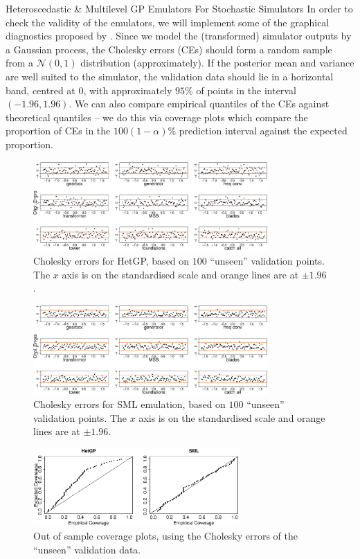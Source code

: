 \begin{chapter}{Heteroscedastic \& Multilevel GP Emulators For Stochastic Simulators\label{Ch:Hetsml}}
In order to check the validity of the emulators, we will implement some of the graphical diagnostics proposed by \citet{Bastos09}. Since we model the (transformed) simulator outputs by a Gaussian process, the Cholesky errors (CEs) should form a random sample from a $\mathcal{N}(0, 1)$ distribution (approximately). If the posterior mean and variance are well suited to the simulator, the validation data should lie in a horizontal band, centred at $0$, with approximately $95\%$ of points in the interval $(-1.96, 1.96)$. We can also compare empirical quantiles of the CEs against theoretical quantiles -- we do this via coverage plots which compare the proportion of CEs in the $100(1-\alpha)\%$ prediction interval against the expected proportion.
\begin{figure}[!h]
    \centering
    \includegraphics[width = 0.8\textwidth]{sml-het-fig/het-resids.eps}
    \caption{Cholesky errors for HetGP, based on $100$ ``unseen'' validation points. The $x$ axis is on the standardised scale and orange lines are at $\pm 1.96$.}
	\label{Fig:het-resids}
\end{figure}
\begin{figure}[!h]
    \centering
\includegraphics[width = 0.8\textwidth]{sml-het-fig/sml-resids.eps}
    \caption{Cholesky errors for SML emulation, based on $100$ ``unseen'' validation points. The $x$ axis is on the standardised scale and orange lines are at $\pm 1.96$.}
	\label{Fig:ml-resids}
\end{figure}
\begin{figure}[!h]
    \centering
\includegraphics[width = 0.7\textwidth]{sml-het-fig/coverage.eps}
    \caption{Out of sample coverage plots, using the Cholesky errors of the ``unseen'' validation data.}
	\label{Fig:coverage}
\end{figure}


\end{chapter}
